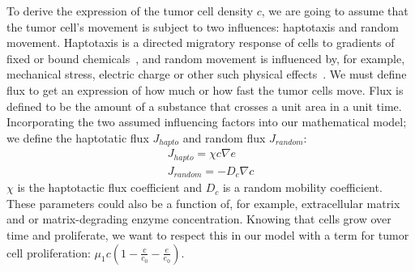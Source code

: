 To derive the expression of the tumor cell density $c$, we are going to assume that the tumor cell's movement is subject to two influences: haptotaxis and random movement. Haptotaxis is a directed migratory response of cells to gradients of fixed or bound chemicals~\cite{anderson_continuous_1998}, and random movement is influenced by, for example, mechanical stress, electric charge or other such physical effects~\cite{Merino-Casallo2022-di}. We must define flux to get an expression of how much or how fast the tumor cells move. Flux is defined to be the amount of a substance that crosses a unit area in a unit time. Incorporating the two assumed influencing factors into our mathematical model; we define the haptotatic flux $J_{hapto}$ and random flux $J_{random}$:
\begin{align*}
    J_{hapto} = \chi c \nabla e \\
    J_{random} = -D_c \nabla c
\end{align*}
$\chi$ is the haptotactic flux coefficient and $D_c$ is a random mobility coefficient. These parameters could also be a function of, for example, extracellular matrix and or matrix-degrading enzyme concentration. Knowing that cells grow over time and proliferate, we want to respect this in our model with a term for tumor cell proliferation: $\mu_1 c (1-\frac{c}{c_0} - \frac{e}{e_0})$.

